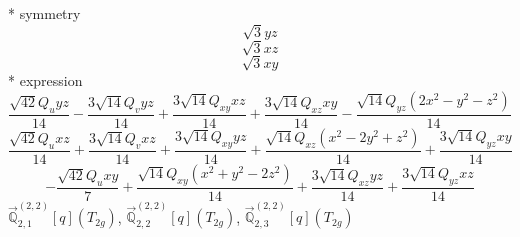 \documentclass[fleqn,8pt]{jsarticle}
\begin{document}
\noindent\quad ** symmetry
\begin{dmath*}
\sqrt{3} y z
\end{dmath*}
\begin{dmath*}
\sqrt{3} x z
\end{dmath*}
\begin{dmath*}
\sqrt{3} x y
\end{dmath*}
\noindent\quad ** expression
\begin{dmath*}
\frac{\sqrt{42} Q_{u} y z}{14} - \frac{3 \sqrt{14} Q_{v} y z}{14} + \frac{3 \sqrt{14} Q_{xy} x z}{14} + \frac{3 \sqrt{14} Q_{xz} x y}{14} - \frac{\sqrt{14} Q_{yz} \left(2 x^{2} - y^{2} - z^{2}\right)}{14}
\end{dmath*}
\begin{dmath*}
\frac{\sqrt{42} Q_{u} x z}{14} + \frac{3 \sqrt{14} Q_{v} x z}{14} + \frac{3 \sqrt{14} Q_{xy} y z}{14} + \frac{\sqrt{14} Q_{xz} \left(x^{2} - 2 y^{2} + z^{2}\right)}{14} + \frac{3 \sqrt{14} Q_{yz} x y}{14}
\end{dmath*}
\begin{dmath*}
- \frac{\sqrt{42} Q_{u} x y}{7} + \frac{\sqrt{14} Q_{xy} \left(x^{2} + y^{2} - 2 z^{2}\right)}{14} + \frac{3 \sqrt{14} Q_{xz} y z}{14} + \frac{3 \sqrt{14} Q_{yz} x z}{14}
\end{dmath*}
\noindent\quad $\vec{\mathbb{Q}}_{2,1}^{(2,2)}[q](T_{2g})$, $\vec{\mathbb{Q}}_{2,2}^{(2,2)}[q](T_{2g})$, $\vec{\mathbb{Q}}_{2,3}^{(2,2)}[q](T_{2g})$
\end{document}
